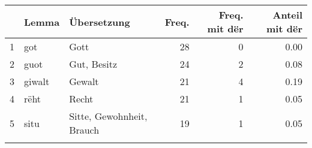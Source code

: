 \begin{tabular}{rllrrr}
  \lsptoprule
 & Lemma & Übersetzung & Freq. & Freq. mit dër & Anteil mit dër \\ 
  \midrule
1 & got & Gott &  28 &   0 & 0.00 \\ 
  2 & guot & Gut, Besitz &  24 &   2 & 0.08 \\ 
  3 & giwalt & Gewalt &  21 &   4 & 0.19 \\ 
  4 & rëht & Recht &  21 &   1 & 0.05 \\ 
  5 & situ & Sitte, Gewohnheit, Brauch &  19 &   1 & 0.05 \\ 
   \lspbottomrule
\end{tabular}
